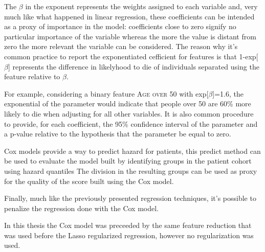 The $\beta$ in the exponent represents the weights assigned to each variable and, very much like what happened in linear regression, these coefficients can be intended as a proxy of importance in the model: coefficients close to zero signify no particular importance of the variable whereas the more the value is distant from zero the more relevant the variable can be considered.
The reason why it's common practice to report the exponentiated cefficient for features is that 1-exp[$\beta$] represents the difference in likelyhood to die of individuals separated using the feature relative to $\beta$. 

For example, considering a binary feature {\scshape Age over 50} with exp[$\beta$]=1.6, the exponential of the parameter would indicate that people over 50 are 60\% more likely to die when adjusting for all other variables.
It is also common procedure to provide, for each coefficient, the 95\% confidence interval of the parameter and a p-value relative to the hypothesis that the parameter be equal to zero.

Cox models provide a way to predict hazard for patients, this predict method can be used to evaluate the model built by identifying groups in the patient cohort using hazard quantiles 
The division in the resulting groups can be used as proxy for the quality of the score built using the Cox model.

Finally, much like the previously presented regression techniques, it's possible to penalize the regression done with the Cox model.

In this thesis the Cox model was preceeded by the same feature reduction that was used before the Lasso regularized regression, however no regularization was used.






